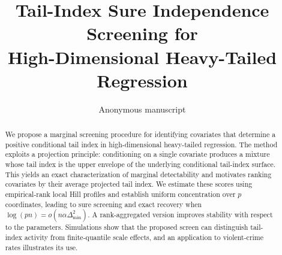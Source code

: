 \documentclass[11pt]{article}
\title{Tail-Index Sure Independence Screening for\\High-Dimensional Heavy-Tailed Regression}
\author{Anonymous manuscript}\date{}
\theoremstyle{remark}\newtheorem{remark}[theorem]{Remark}
\begin{document}
\maketitle
\begin{abstract} We propose a marginal screening procedure for identifying covariates that determine a positive conditional tail index in high-dimensional heavy-tailed regression. The method exploits a projection principle: conditioning on a single covariate produces a mixture whose tail index is the upper envelope of the underlying conditional tail-index surface. This yields an exact characterization of marginal detectability and motivates ranking covariates by their average projected tail index. We estimate these scores using empirical-rank local Hill profiles and establish uniform concentration over $p$ coordinates, leading to sure screening and exact recovery when $\log(pn)=o(n\alpha \Delta_{\min}^2)$. A rank-aggregated version improves stability with respect to the parameters. Simulations show that the proposed screen can distinguish tail-index activity from finite-quantile scale effects, and an application to violent-crime rates illustrates its use. 
\end{abstract}




\FloatBarrier

\FloatBarrier

\appendix


\end{document}
